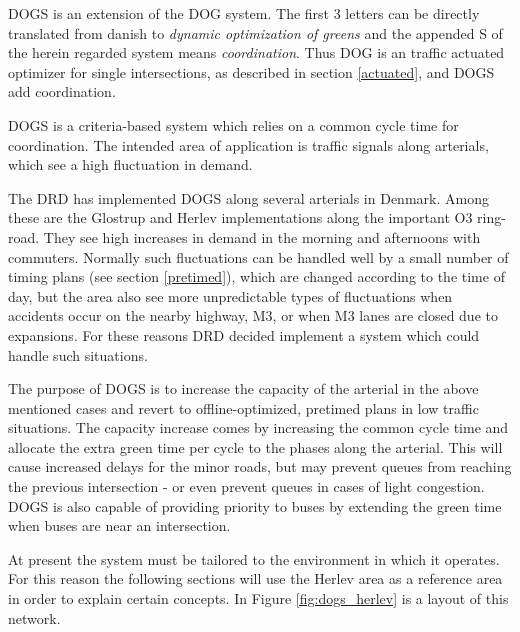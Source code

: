 \label{dogs}
DOGS is an extension of the DOG system. The first 3 letters can be directly translated from danish to \textit{dynamic optimization of greens} and the appended S of the herein regarded system means \textit{coordination}. Thus DOG is an traffic actuated optimizer for single intersections, as described in section \ref{actuated}, and DOGS add coordination.

DOGS is a criteria-based system which relies on a common cycle time for coordination. The intended area of application is traffic signals along arterials, which see a high fluctuation in demand. 

The DRD has implemented DOGS along several arterials in Denmark. 
Among these are the Glostrup and Herlev implementations along the important O3 ring-road. They see high increases in demand in the morning and afternoons with commuters. Normally such fluctuations can be handled well by a small number of timing plans (see section \ref{pretimed}), which are changed according to the time of day, but the area also see more unpredictable types of fluctuations when accidents occur on the nearby highway, M3, or when M3 lanes are closed due to expansions. For these reasons DRD decided implement a system which could handle such situations.

The purpose of DOGS is to increase the capacity of the arterial in the above mentioned cases and revert to offline-optimized, pretimed plans in low traffic situations. The capacity increase comes by increasing the common cycle time and allocate the extra green time per cycle to the phases along the arterial. This will cause increased delays for the minor roads, but may prevent queues from reaching the previous intersection - or even prevent queues in cases of light congestion.
DOGS is also capable of providing priority to buses by extending the green time when buses are near an intersection.

At present the system must be tailored to the environment in which it operates. For this reason the following sections will use the Herlev area as a reference area in order to explain certain concepts. In Figure \ref{fig:dogs_herlev} is a layout of this network.

